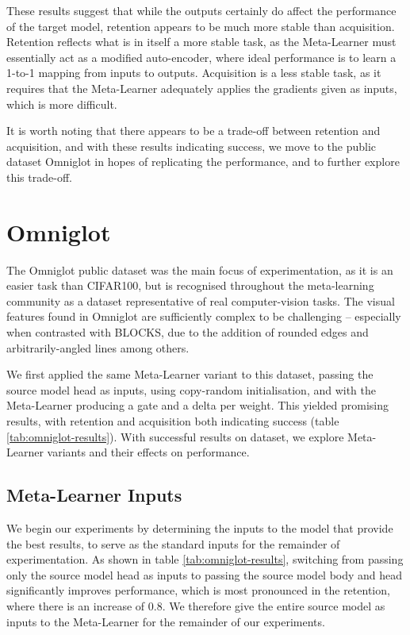 \documentclass{report}
\begin{document}
These results suggest that while the outputs certainly do affect the performance of the target model, retention appears to be much more stable than acquisition. Retention reflects what is in itself a more stable task, as the Meta-Learner must essentially act as a modified auto-encoder, where ideal performance is to learn a 1-to-1 mapping from inputs to outputs. Acquisition is a less stable task, as it requires that the Meta-Learner adequately applies the gradients given as inputs, which is more difficult. \par
It is worth noting that there appears to be a trade-off between retention and acquisition, and with these results indicating success, we move to the public dataset Omniglot in hopes of replicating the performance, and to further explore this trade-off.


\section{Omniglot}
The Omniglot public dataset was the main focus of experimentation, as it is an easier task than CIFAR100, but is recognised throughout the meta-learning community as a dataset representative of real computer-vision tasks. The visual features found in Omniglot are sufficiently complex to be challenging -- especially when contrasted with BLOCKS, due to the addition of rounded edges and arbitrarily-angled lines among others. \par
We first applied the same Meta-Learner variant to this dataset, passing the source model head as inputs, using copy-random initialisation, and with the Meta-Learner producing a gate and a delta per weight. This yielded promising results, with retention and acquisition both indicating success (table \ref{tab:omniglot-results}). With successful results on dataset, we explore Meta-Learner variants and their effects on performance. \par

\subsection{Meta-Learner Inputs}
We begin our experiments by determining the inputs to the model that provide the best results, to serve as the standard inputs for the remainder of experimentation. As shown in table \ref{tab:omniglot-results}, switching from passing only the source model head as inputs to passing the source model body and head significantly improves performance, which is most pronounced in the retention, where there is an increase of $0.8$. 
We therefore give the entire source model as inputs to the Meta-Learner for the remainder of our experiments. 
\end{document}

